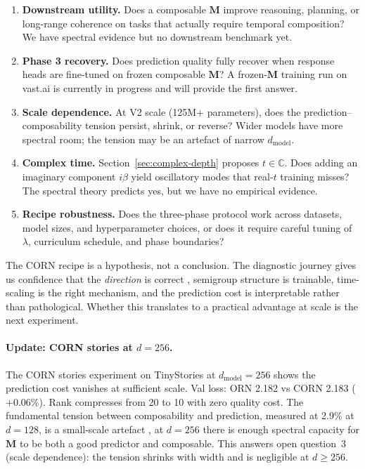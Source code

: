 \documentclass[11pt, a4paper]{article}
\newcommand{\M}{\mathbf{M}}
\theoremstyle{plain}
\theoremstyle{remark}
\begin{document}
\begin{enumerate}[nosep]
  \item \textbf{Downstream utility.} Does a composable $\M$ improve reasoning, planning, or long-range coherence on tasks that actually require temporal composition?  We have spectral evidence but no downstream benchmark yet.

  \item \textbf{Phase 3 recovery.} Does prediction quality fully recover when response heads are fine-tuned on frozen composable $\M$?  A frozen-$\M$ training run on vast.ai is currently in progress and will provide the first answer.

  \item \textbf{Scale dependence.} At V2 scale (125M+ parameters), does the prediction--composability tension persist, shrink, or reverse?  Wider models have more spectral room; the tension may be an artefact of narrow $d_{\mathrm{model}}$.

  \item \textbf{Complex time.} Section~\ref{sec:complex-depth} proposes $t \in \mathbb{C}$.  Does adding an imaginary component $i\beta$ yield oscillatory modes that real-$t$ training misses?  The spectral theory predicts yes, but we have no empirical evidence.

  \item \textbf{Recipe robustness.} Does the three-phase protocol work across datasets, model sizes, and hyperparameter choices, or does it require careful tuning of $\lambda$, curriculum schedule, and phase boundaries?
\end{enumerate}

\noindent The CORN recipe is a hypothesis, not a conclusion.
The diagnostic journey gives us confidence that the \emph{direction} is correct ,  semigroup structure is trainable, time-scaling is the right mechanism, and the prediction cost is interpretable rather than pathological.
Whether this translates to a practical advantage at scale is the next experiment.

\paragraph{Update: CORN stories at $d=256$.}
The CORN stories experiment on TinyStories at $d_{\mathrm{model}}=256$ shows the prediction cost vanishes at sufficient scale.
Val loss: ORN 2.182 vs CORN 2.183 ($+0.06\%$).
Rank compresses from 20 to 10 with zero quality cost.
The fundamental tension between composability and prediction, measured at 2.9\% at $d=128$, is a small-scale artefact ,  at $d=256$ there is enough spectral capacity for $\M$ to be both a good predictor and composable.
This answers open question~3 (scale dependence): the tension shrinks with width and is negligible at $d \geq 256$.
\end{document}
